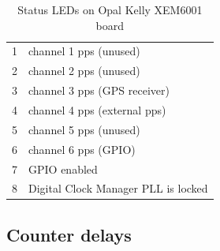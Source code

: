 \begin{table}
\begin{center}
\begin{tabular}{ll}
1 & channel 1 pps (unused)\\
2 & channel 2 pps (unused) \\
3 & channel 3 pps (GPS receiver)\\
4 & channel 4 pps (external pps)\\
5 & channel 5 pps (unused)\\
6 & channel 6 pps (GPIO)\\
7 & GPIO enabled\\
8 & Digital Clock Manager PLL is locked\\
\end{tabular}
\end{center}
\caption{Status LEDs on Opal Kelly XEM6001 board \label{t:XEM6001LEDs}}
\end{table}

\subsection{Counter delays}